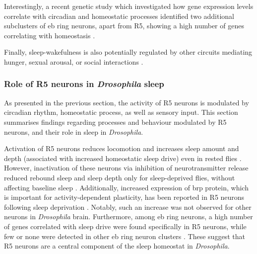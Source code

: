 \documentclass[../main.tex]{subfiles}
\begin{document}
Interestingly, a recent genetic study which investigated how gene expression levels correlate with circadian and homeostatic processes identified two additional subclusters of \gls{eb} ring neurons, apart from R5, showing a high number of genes correlating with homeostasis \parencite{doppSinglecellTranscriptomicsReveals2024}.

Finally, sleep-wakefulness is also potentially regulated by other circuits mediating hunger, sexual arousal, or
social interactions \parencite{suarez-grimaltNeuralArchitectureSleep2021,shaferRegulationDrosophilaSleep2021}.


\subsubsection{Role of R5 neurons in \textit{Drosophila} sleep} \label{subsubsec:role_of_r5_neurons}

As presented in the previous section, the activity of R5 neurons is modulated by circadian rhythm, homeostatic process, as well as sensory input. This section summarises findings regarding processes and behaviour modulated by R5 neurons, and their role in sleep in \textit{Drosophila}.

Activation of R5 neurons reduces locomotion and increases sleep amount and depth (associated with increased homeostatic sleep drive) even in rested flies \parencite{raccugliaCoherentMultilevelNetwork2022,liuSleepDriveEncoded2016}.
However, inactivation of these neurons via inhibition of neurotransmitter release reduced rebound sleep and sleep depth only for sleep-deprived flies, without affecting baseline sleep \parencite{liuSleepDriveEncoded2016}.
Additionally, increased expression of \gls{brp} protein, which is important for activity-dependent plasticity, has been reported in R5 neurons following sleep deprivation \parencite{liuSleepDriveEncoded2016}.
Notably, such an increase was not observed for other neurons in \textit{Drosophila} brain. Furthermore, among \gls{eb} ring neurons, a high number of genes correlated with sleep drive were found specifically in R5 neurons, while few or none were detected in other \gls{eb} ring neuron clusters \parencite{doppSinglecellTranscriptomicsReveals2024}. These suggest that R5 neurons are a central component of the sleep homeostat in \textit{Drosophila}.
\end{document}
